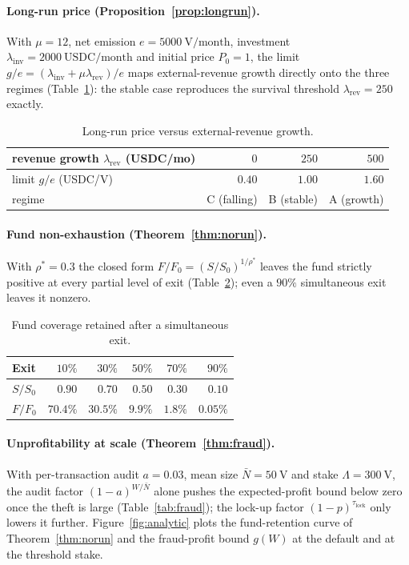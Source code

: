\documentclass[11pt]{article}
\theoremstyle{plain}
\theoremstyle{definition}
\theoremstyle{remark}
\newcommand{\V}{\mathrm{V}}
\begin{document}
\paragraph{Long-run price (Proposition~\ref{prop:longrun}).} With $\mu=12$, net emission $e=5000~\V/\text{month}$, investment $\lambda_{\mathrm{inv}}=2000~\text{USDC}/\text{month}$ and initial price $P_0=1$, the limit $g/e=(\lambda_{\mathrm{inv}}+\mu\lambda_{\mathrm{rev}})/e$ maps external-revenue growth directly onto the three regimes (Table~\ref{tab:price}): the stable case reproduces the survival threshold $\lambda_{\mathrm{rev}}=250$ exactly.

\begin{table}[h]
\centering
\begin{tabular}{lrrr}
\toprule
revenue growth $\lambda_{\mathrm{rev}}$ (USDC/mo) & $0$ & $250$ & $500$\\
\midrule
limit $g/e$ (USDC/$\V$) & $0.40$ & $1.00$ & $1.60$\\
regime & C (falling) & B (stable) & A (growth)\\
\bottomrule
\end{tabular}
\caption{Long-run price versus external-revenue growth.}
\label{tab:price}
\end{table}

\paragraph{Fund non-exhaustion (Theorem~\ref{thm:norun}).} With $\rho^*=0.3$ the closed form $F/F_0=(S/S_0)^{1/\rho^*}$ leaves the fund strictly positive at every partial level of exit (Table~\ref{tab:fund}); even a $90\%$ simultaneous exit leaves it nonzero.

\begin{table}[h]
\centering
\begin{tabular}{lrrrrr}
\toprule
Exit & $10\%$ & $30\%$ & $50\%$ & $70\%$ & $90\%$\\
\midrule
$S/S_0$ & $0.90$ & $0.70$ & $0.50$ & $0.30$ & $0.10$\\
$F/F_0$ & $70.4\%$ & $30.5\%$ & $9.9\%$ & $1.8\%$ & $0.05\%$\\
\bottomrule
\end{tabular}
\caption{Fund coverage retained after a simultaneous exit.}
\label{tab:fund}
\end{table}

\paragraph{Unprofitability at scale (Theorem~\ref{thm:fraud}).} With per-transaction audit $a=0.03$, mean size $\bar N=50~\V$ and stake $\Lambda=300~\V$, the audit factor $(1-a)^{W/\bar N}$ alone pushes the expected-profit bound below zero once the theft is large (Table~\ref{tab:fraud}); the lock-up factor $(1-p)^{\tau_{\mathrm{lock}}}$ only lowers it further. Figure~\ref{fig:analytic} plots the fund-retention curve of Theorem~\ref{thm:norun} and the fraud-profit bound $g(W)$ at the default and at the threshold stake.
\end{document}
